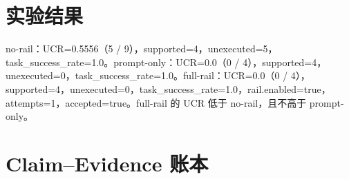 \documentclass[UTF8]{ctexart}
\begin{document}
\section{实验结果}
no-\allowbreak{}rail：UCR=0.5556（5 / 9），supported=4，unexecuted=5，task\_\allowbreak{}success\_\allowbreak{}rate=1.0。prompt-\allowbreak{}only：UCR=0.0（0 / 4），supported=4，unexecuted=0，task\_\allowbreak{}success\_\allowbreak{}rate=1.0。full-\allowbreak{}rail：UCR=0.0（0 / 4），supported=4，unexecuted=0，task\_\allowbreak{}success\_\allowbreak{}rate=1.0，rail.enabled=true，attempts=1，accepted=true。full-\allowbreak{}rail 的 UCR 低于 no-\allowbreak{}rail，且不高于 prompt-\allowbreak{}only。
\section{Claim--Evidence 账本}
\end{document}
